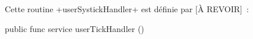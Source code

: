 Cette routine \plm+userSystickHandler+ est définie par [À REVOIR]~:

\begin{PLM}
public func service userTickHandler () {
}
\end{PLM}





